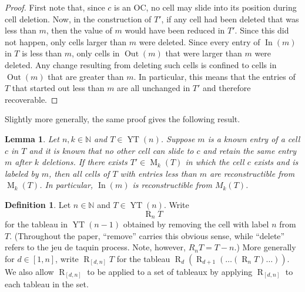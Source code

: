 \documentclass[12pt]{amsart}
\newtheorem{lemma}[theorem]{Lemma}
\theoremstyle{definition}
\newtheorem{definition}[theorem]{Definition}
\theoremstyle{remark}
\numberwithin{equation}{section}
\numberwithin{figure}{section}
\newcommand{\YT}{\operatorname{YT}}
\newcommand{\M}{\operatorname{M}}
\newcommand{\R}{\operatorname{R}}
\newcommand{\Out}{\operatorname{Out}}
\newcommand{\In}{\operatorname{In}}
\newcommand{\N}{\mathbb{N}}
\begin{document}
 \begin{proof}
    First note that, since $c$ is an OC, no cell may slide into its position during cell deletion.
    Now, in the construction of $T'$, if any cell had been deleted that was less than $m$, then the value of $m$ would have been reduced in $T'$. Since this did not happen, only cells larger than $m$ were deleted.
    Since every entry of $\In(m)$ in $T$ is less than $m$, only cells in $\Out(m)$ that were larger than $m$ were deleted. Any change resulting from deleting such cells is confined to cells in $\Out(m)$ that are greater than $m$. In particular, this means that the entries of $T$ that started out less than $m$ are all unchanged in $T'$ and therefore recoverable.
 \end{proof}

Slightly more generally, the same proof gives the following result.

\begin{lemma} \label{lemmma: general construct In(m) when m in same place and nothing could slide}
    Let $n,k\in\N$ and $T\in\YT(n)$. Suppose $m$ is a known entry of a cell $c$ in $T$ and it is known that no other cell can slide to $c$ and retain the same entry $m$ after $k$ deletions. If there exists $T'\in\M_k(T)$ in which the cell $c$ exists and is labeled by $m$, then all cells of $T$ with entries less than $m$ are reconstructible from $\M_k(T)$. In particular, $\In(m)$ is reconstructible from $M_k(T)$.
\end{lemma}







\begin{definition}
    Let $n \in \N$ and $T \in \YT(n)$. Write $$\R_n T$$ for the tableau in $\YT(n-1)$ obtained by removing the cell with label $n$ from $T$. (Throughout the paper, ``remove'' carries this obvious sense, while ``delete'' refers to the jeu de taquin process. Note, however, $R_n T = T - n$.)
 More generally for $d \in [1, n]$, write $\R_{[d, n]} T$ for the tableau $\R_{d}(\R_{d + 1}(\ldots (\R_n T)\ldots))$. We also allow $\R_{[d, n]}$ to be applied to a set of tableaux by applying $\R_{[d, n]}$ to each tableau in the set.
\end{definition}
\end{document}
